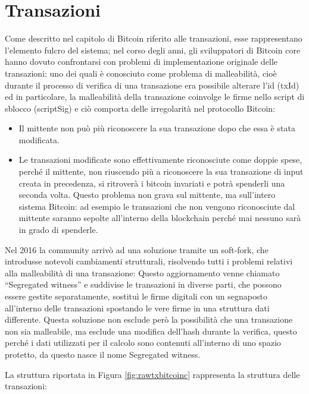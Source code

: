 \section{Transazioni}
\label{sec:transazionibitcoincore}
Come descritto nel capitolo di Bitcoin riferito alle transazioni, esse rappresentano l’elemento fulcro del sistema; nel corso degli anni, gli sviluppatori di Bitcoin core hanno dovuto confrontarsi con problemi di implementazione originale delle transazioni: uno dei quali è conosciuto come problema di malleabilità, cioè durante il processo di verifica di una transazione era possibile alterare l’id (txId) ed in particolare, la malleabilità della transazione coinvolge le firme nello script di sblocco (scriptSig) e ciò comporta delle irregolarità nel protocollo Bitcoin:

\begin{itemize}
  \item Il mittente non può più riconoscere la sua transazione dopo che essa è stata modificata.
  \item Le transazioni modificate sono effettivamente riconosciute come doppie spese, perché il mittente, non riuscendo più a riconoscere la sua transazione di input creata in precedenza, si ritroverà i bitcoin invariati e potrà spenderli una seconda volta.
  Questo problema non grava sul mittente, ma sull’intero sistema Bitcoin: ad esempio le transazioni che non vengono riconosciute dal mittente saranno sepolte all’interno della blockchain perché mai nessuno sarà in grado di spenderle.
\end{itemize}

Nel 2016 la community arrivò ad una soluzione tramite un soft-fork, che introdusse notevoli cambiamenti strutturali, risolvendo tutti i problemi relativi alla malleabilità di una transazione: Questo aggiornamento venne chiamato “Segregated witness” e suddivise le transazioni in diverse parti, che possono essere gestite separatamente, sostituì le firme digitali con un segnaposto all’interno delle transazioni spostando le vere firme in una struttura dati differente. Questa soluzione non esclude però la possibilità che una transazione non sia malleabile, ma esclude una modifica dell’hash durante la verifica, questo perché i dati utilizzati per il calcolo sono contenuti all’interno di uno spazio protetto, da questo nasce il nome Segregated witness.

La struttura riportata in Figura \ref{fig:rawtxbitcoinc} rappresenta la struttura delle transazioni:


